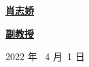 \begin{flushleft}
	{\kaishu\underline{\hspace{1.8cm}\textbf{肖志娇}\hspace{3.5cm}} }                         \\
	\vspace{10bp}
	
	{\kaishu\underline{\hspace{3.2cm}\textbf{副教授}\hspace{3.8cm}} }                         \\
	
\end{flushleft}

\vskip 4cm

\centerline{ 2022 年 \  4 月\  1 日}